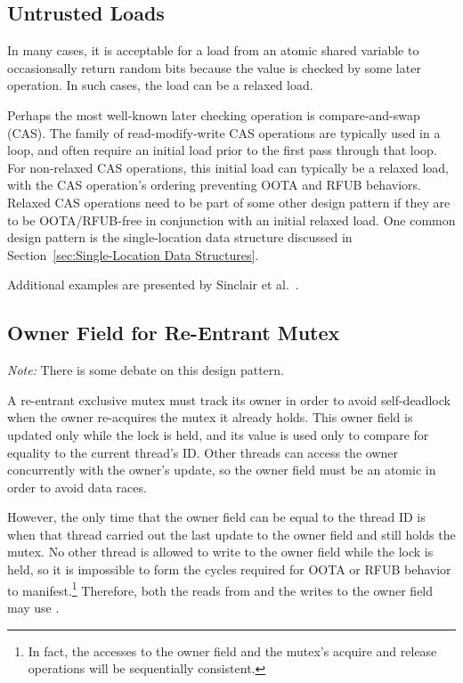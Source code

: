 \documentclass{article}
\begin{document}
\subsection{Untrusted Loads}
\label{sec:Untrusted Loads}

In many cases, it is acceptable for a load from an atomic shared variable
to occasionsally return random bits because the value is checked by
some later operation.
In such cases, the load can be a relaxed load.

Perhaps the most well-known later checking operation is compare-and-swap (CAS).
The  family of read-modify-write
CAS operations are typically used in a loop, and often require an initial
load prior to the first pass through that loop.
For non-relaxed CAS operations, this initial load can typically be a
relaxed load, with the CAS operation's ordering preventing OOTA and RFUB
behaviors.
Relaxed CAS operations need to be part of some other design pattern if they
are to be OOTA/RFUB-free in conjunction with an initial relaxed load.
One common design pattern is the single-location data structure discussed in
Section~\ref{sec:Single-Location Data Structures}.

Additional examples are presented by
Sinclair et al.~\cite{Sinclair:2017:CAR:3079856.3080206}.

\subsection{Owner Field for Re-Entrant Mutex}
\label{sec:Owner Field for Re-Entrant Mutex}

\emph{Note:} There is some debate on this design pattern.

A re-entrant exclusive mutex must track its owner in order to avoid
self-deadlock when the owner re-acquires the mutex it already holds.
This owner field is updated only while the lock is held, and its value
is used only to compare for equality to the current thread's ID.
Other threads can access the owner concurrently with the owner's
update, so the owner field must be an atomic in order to avoid data races.

However, the only time that the owner field can be equal to the thread ID
is when that thread carried out the last update to the owner field and
still holds the mutex.
No other thread is allowed to write to the owner field while the lock
is held, so it is impossible to form the cycles required for OOTA or
RFUB behavior to manifest.\footnote{
	In fact, the accesses to the owner field and the mutex's acquire
	and release operations will be sequentially consistent.}
Therefore, both the reads from and the writes to the owner field
may use .
\end{document}
